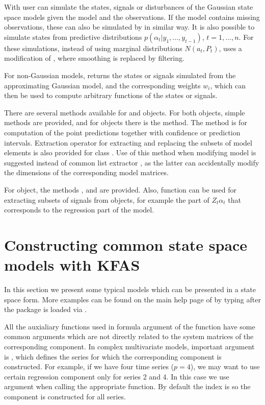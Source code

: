 \documentclass[nojss,article]{jss}\usepackage[]{graphicx}\usepackage[]{color}
\begin{document}
With  user can simulate the states, signals or disturbances of the Gaussian state space models given the model and the observations. If the model contains missing observations, these can also be simulated by  in similar way. It is also possible to simulate states from predictive distributions $p(\alpha_t|y_1,\ldots,y_{t-1})$, $t=1,\ldots,n$. For these simulations, instead of using marginal distributions $N(a_t,P_t)$,  uses a modification of \citet{DK2002}, where smoothing is replaced by filtering.

For non-Gaussian models,  returns the states or signals simulated from the approximating Gaussian model, and the corresponding weights $w_i$, which can then be used to compute arbitrary functions of the states or signals.

There are several  methods available for  and  objects. For both objects, simple  methods are provided, and for  objects there is the  method. The  method is for computation of the point predictions together with confidence or prediction intervals. Extraction operator \code{[} for extracting and replacing the subsets of model elements is also provided for class . Use of this method when modifying model is suggested instead of common list extractor \code{$}, as the latter can accidentally modify the dimensions of the corresponding model matrices.

For  object, the methods ,  and  are provided. Also, function  can be used for extracting subsets of signals from  objects, for example the part of $Z_t\alpha_t$ that corresponds to the regression part of the model.


\section{Constructing common state space models with KFAS}\label{models}

In this section we present some typical models which can be presented in a state space form. More examples can be found on the main help page of  by typing  after the package is loaded via .

All the auxialiary functions used in formula argument of the function  have some common arguments which are not directly related to the system matrices of the corresponding component. In complex multivariate models, important argument is , which defines the series for which the corresponding component is constructed. For example, if we have four time series ($p=4$), we may want to use certain regression component only for series 2 and 4. In this case we use argument  when calling the appropriate  function. By default the index is  so the component is constructed for all series.
\end{document}
